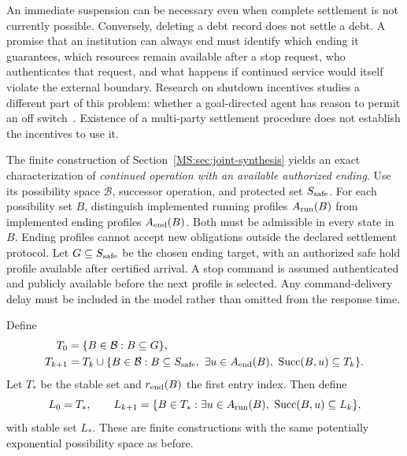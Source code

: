 An immediate suspension can be necessary even when complete settlement is not currently possible. Conversely, deleting a debt record does not settle a debt. A promise that an institution can always end must identify which ending it guarantees, which resources remain available after a stop request, who authenticates that request, and what happens if continued service would itself violate the external boundary. Research on shutdown incentives studies a different part of this problem: whether a goal-directed agent has reason to permit an off switch~\cite{MS:offswitch}. Existence of a multi-party settlement procedure does not establish the incentives to use it.

The finite construction of Section~\ref{MS:sec:joint-synthesis} yields an exact characterization of \emph{continued operation with an available authorized ending}. Use its possibility space $\mathcal B$, successor operation, and protected set $S_{\rm safe}$. For each possibility set $B$, distinguish implemented running profiles $A_{\rm run}(B)$ from implemented ending profiles $A_{\rm end}(B)$. Both must be admissible in every state in $B$. Ending profiles cannot accept new obligations outside the declared settlement protocol. Let $G\subseteq S_{\rm safe}$ be the chosen ending target, with an authorized safe hold profile available after certified arrival. A stop command is assumed authenticated and publicly available before the next profile is selected. Any command-delivery delay must be included in the model rather than omitted from the response time.

Define
\begin{align}
 T_0&=\{B\in\mathcal B:B\subseteq G\},\label{MS:eq:stop-target}\\
 T_{k+1}&=T_k\cup\{B\in\mathcal B:B\subseteq S_{\rm safe},\
      \exists u\in A_{\rm end}(B),\ \operatorname{Succ}(B,u)\subseteq T_k\}.
      \label{MS:eq:stop-attractor}
\end{align}
Let $T_*$ be the stable set and $r_{\rm end}(B)$ the first entry index. Then define
\begin{equation}\label{MS:eq:stoppable-kernel}
 L_0=T_*,\qquad
 L_{k+1}=\{B\in T_*:\exists u\in A_{\rm run}(B),\
                         \operatorname{Succ}(B,u)\subseteq L_k\},
\end{equation}
with stable set $L_*$. These are finite constructions with the same potentially exponential possibility space as before.

